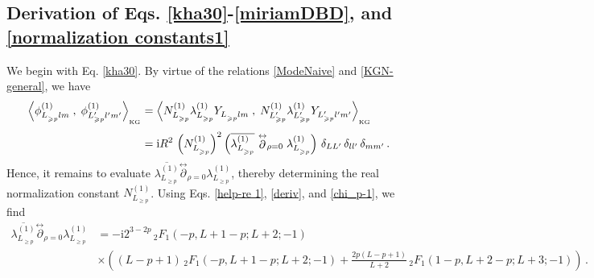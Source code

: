 \documentclass[aps,twocolumn,nofootinbib]{revtex4}
\begin{document}
{\begin{appendix}
\begin{widetext}

\subsection{Derivation of Eqs. \eqref{kha30}-\eqref{miriamDBD}, and \eqref{normalization constants1}}\label{norm-com}

We begin with Eq. \eqref{kha30}. By virtue of the relations \eqref{ModeNaive} and \eqref{KGN-general}, we have
\begin{align}\label{miriam6}
    \left\langle \phi^{(1)}_{L^{}_{\geqslant p}lm} \;,\; \phi^{(1)}_{L^\prime_{\geqslant p}l^\prime_{}m^\prime_{}}\right\rangle_{\vphantom{}_{\text{KG}}} &= \left\langle N^{(1)}_{L^{}_{\geqslant p}} \lambda_{L^{}_{\geqslant p}}^{(1)} Y^{}_{L^{}_{\geqslant p}lm} \;,\; N^{(1)}_{L^{\prime}_{\geqslant p}} \lambda_{L^{\prime}_{\geqslant p}}^{(1)} Y^{}_{L^\prime_{\geqslant p}l^\prime_{}m^\prime_{}}\right\rangle_{\vphantom{}_{\text{KG}}} \nonumber\\[3pt]
    &= \mathrm{i} R^2 \, \left(N^{(1)}_{L^{}_{\geqslant p}}\right)^2 \left( \overline{\lambda_{L^{}_{\geqslant p}}^{(1)}} \stackrel{\leftrightarrow}{\partial}_{\rho=0} \lambda_{L^{}_{\geqslant p}}^{(1)} \right) \,\delta_{LL^\prime} \,\delta_{ll^\prime} \,\delta_{mm^\prime}\,.
\end{align}
Hence, it remains to evaluate $\overline{\lambda_{L^{}_{\geqslant p}}^{(1)}} \stackrel{\leftrightarrow}{\partial}_{\rho=0} \lambda_{L^{}_{\geqslant p}}^{(1)}$, thereby determining the real normalization constant $N^{(1)}_{L^{}_{\geqslant p}}$. Using Eqs. \eqref{help-re 1}, \eqref{deriv}, and \eqref{chi_p-1}, we find
\begin{align}\label{miriam5}
    \overline{\lambda_{L^{}_{\geqslant p}}^{(1)}} \stackrel{\leftrightarrow}{\partial}_{\rho=0} \lambda_{L^{}_{\geqslant p}}^{(1)} &= -\mathrm{i} 2^{3-2p}\, {}_2F_1(-p, L+1-p; L+2; -1)\nonumber \\
    &\times \left( (L-p+1)\, {}_2F_1(-p, L+1-p; L+2; -1) + \frac{2p(L-p+1)}{L+2}\, {}_2F_1(1-p, L+2-p; L+3; -1) \right)\,.
\end{align}


\end{widetext}
\end{appendix}}
\end{document}

